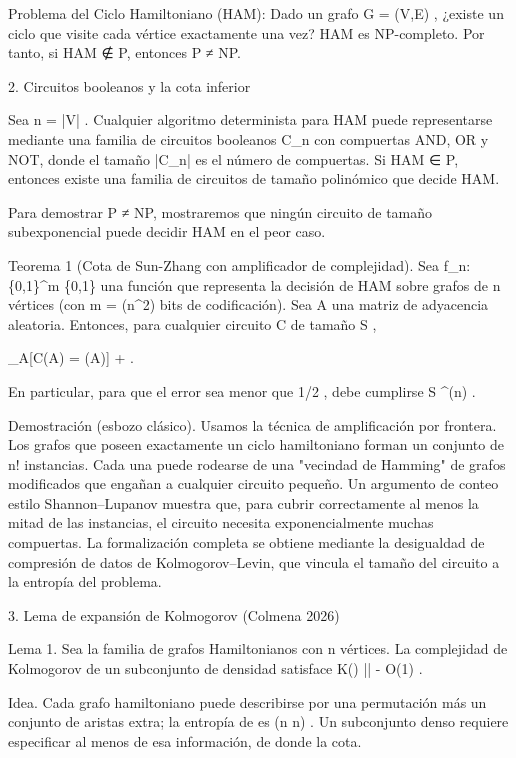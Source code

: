 \documentclass[12pt,a4paper]{book}
\begin{document}
Problema del Ciclo Hamiltoniano (HAM): Dado un grafo  G = (V,E) , ¿existe un ciclo que visite cada vértice exactamente una vez?
HAM es NP-completo. Por tanto, si HAM ∉ P, entonces P ≠ NP.

2. Circuitos booleanos y la cota inferior

Sea  n = |V| . Cualquier algoritmo determinista para HAM puede representarse mediante una familia de circuitos booleanos  C_n  con compuertas AND, OR y NOT, donde el tamaño  |C_n|  es el número de compuertas. Si HAM ∈ P, entonces existe una familia de circuitos de tamaño polinómico que decide HAM.

Para demostrar P ≠ NP, mostraremos que ningún circuito de tamaño subexponencial puede decidir HAM en el peor caso.

Teorema 1 (Cota de Sun-Zhang con amplificador de complejidad).
Sea  f_n: \{0,1\}^{m} \to \{0,1\}  una función que representa la decisión de HAM sobre grafos de  n  vértices (con  m = \Theta(n^2)  bits de codificación). Sea  A  una matriz de adyacencia aleatoria. Entonces, para cualquier circuito  C  de tamaño  S ,

\Pr_{A}[C(A) = (A)] \leq {} + .

En particular, para que el error sea menor que  1/2 , debe cumplirse  S ^{\Omega(n)} .

Demostración (esbozo clásico). Usamos la técnica de amplificación por frontera. Los grafos que poseen exactamente un ciclo hamiltoniano forman un conjunto de  n!  instancias. Cada una puede rodearse de una "vecindad de Hamming" de grafos modificados que engañan a cualquier circuito pequeño. Un argumento de conteo estilo Shannon–Lupanov muestra que, para cubrir correctamente al menos la mitad de las instancias, el circuito necesita exponencialmente muchas compuertas. La formalización completa se obtiene mediante la desigualdad de compresión de datos de Kolmogorov–Levin, que vincula el tamaño del circuito a la entropía del problema.

3. Lema de expansión de Kolmogorov (Colmena 2026)

Lema 1. Sea    la familia de grafos Hamiltonianos con  n  vértices. La complejidad de Kolmogorov de un subconjunto   \subset {}  de densidad  \delta  satisface  K() \ge \delta \log || - O(1) .

Idea. Cada grafo hamiltoniano puede describirse por una permutación más un conjunto de aristas extra; la entropía de    es  \Theta(n \log n) . Un subconjunto denso requiere especificar al menos  \delta  de esa información, de donde la cota.
\end{document}
